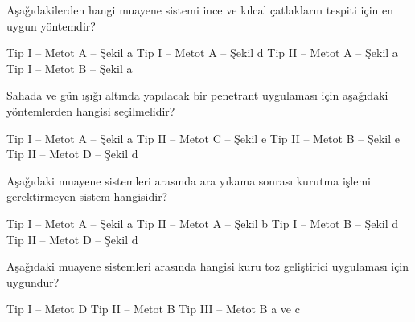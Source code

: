 \begin{question}[subtitle=]
Aşağıdakilerden hangi muayene sistemi ince ve kılcal çatlakların tespiti için en uygun yöntemdir?
	\begin{tasks}
          \task Tip I – Metot A – Şekil a
          \task Tip I – Metot A – Şekil d
          \task Tip II – Metot A – Şekil a
          \task Tip I – Metot B – Şekil a \correct
	\end{tasks}
\end{question}
\begin{solution}
	\correct
\end{solution}

\begin{question}[subtitle=]
Sahada ve gün ışığı altında yapılacak bir penetrant uygulaması için aşağıdaki yöntemlerden hangisi seçilmelidir?
	\begin{tasks}
          \task Tip I – Metot A – Şekil a
          \task Tip II – Metot C – Şekil e \correct
          \task Tip II – Metot B – Şekil e
          \task Tip II – Metot D – Şekil d
	\end{tasks}
\end{question}
\begin{solution}
	\correct
\end{solution}

\begin{question}[subtitle=]
Aşağıdaki muayene sistemleri arasında ara yıkama sonrası kurutma işlemi gerektirmeyen sistem hangisidir?
	\begin{tasks}
          \task Tip I – Metot A – Şekil a
          \task Tip II – Metot A – Şekil b \correct
          \task Tip I – Metot B – Şekil d
          \task Tip II – Metot D – Şekil d
	\end{tasks}
\end{question}
\begin{solution}
	\correct
\end{solution}

\begin{question}[subtitle=]
Aşağıdaki muayene sistemleri arasında hangisi kuru toz geliştirici uygulaması için uygundur?
	\begin{tasks}
          \task Tip I – Metot D
          \task Tip II – Metot B
          \task Tip III – Metot B
          \task a ve c \correct
	\end{tasks}
\end{question}
\begin{solution}
	\correct
\end{solution}

